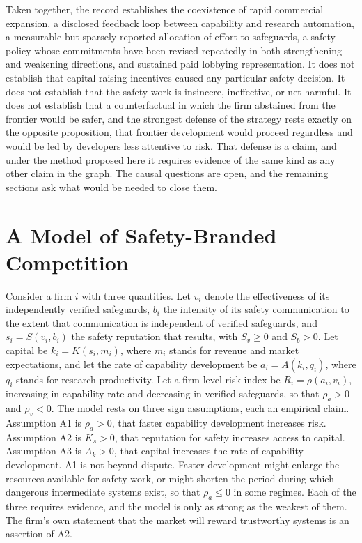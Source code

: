 \documentclass[12pt]{article}
\theoremstyle{definition}
\theoremstyle{remark}
\begin{document}
Taken together, the record establishes the coexistence of rapid commercial expansion, a disclosed feedback loop between capability and research automation, a measurable but sparsely reported allocation of effort to safeguards, a safety policy whose commitments have been revised repeatedly in both strengthening and weakening directions, and sustained paid lobbying representation. It does not establish that capital-raising incentives caused any particular safety decision. It does not establish that the safety work is insincere, ineffective, or net harmful. It does not establish that a counterfactual in which the firm abstained from the frontier would be safer, and the strongest defense of the strategy rests exactly on the opposite proposition, that frontier development would proceed regardless and would be led by developers less attentive to risk. That defense is a claim, and under the method proposed here it requires evidence of the same kind as any other claim in the graph. The causal questions are open, and the remaining sections ask what would be needed to close them.

\section{A Model of Safety-Branded Competition}

Consider a firm $i$ with three quantities. Let $v_i$ denote the effectiveness of its independently verified safeguards, $b_i$ the intensity of its safety communication to the extent that communication is independent of verified safeguards, and $s_i=S(v_i,b_i)$ the safety reputation that results, with $S_v\ge 0$ and $S_b>0$. Let capital be $k_i=K(s_i,m_i)$, where $m_i$ stands for revenue and market expectations, and let the rate of capability development be $a_i=A(k_i,q_i)$, where $q_i$ stands for research productivity. Let a firm-level risk index be $R_i=\rho(a_i,v_i)$, increasing in capability rate and decreasing in verified safeguards, so that $\rho_a>0$ and $\rho_v<0$. The model rests on three sign assumptions, each an empirical claim. Assumption A1 is $\rho_a>0$, that faster capability development increases risk. Assumption A2 is $K_s>0$, that reputation for safety increases access to capital. Assumption A3 is $A_k>0$, that capital increases the rate of capability development. A1 is not beyond dispute. Faster development might enlarge the resources available for safety work, or might shorten the period during which dangerous intermediate systems exist, so that $\rho_a\le 0$ in some regimes. Each of the three requires evidence, and the model is only as strong as the weakest of them. The firm's own statement that the market will reward trustworthy systems is an assertion of A2.
\end{document}
